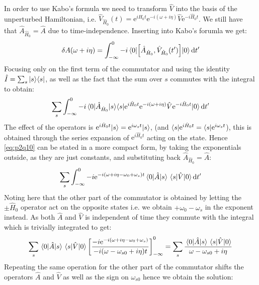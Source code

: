 \begin{solution}
In order to use Kabo's formula we need to transform $\hat{V}$ into the basis of the unperturbed Hamiltonian, i.e. $\hat{V}_{\hat{H}_0}(t) = \mathrm{e}^{i\hat{H}_0t}\mathrm{e}^{-i(\omega + i\eta)}\hat{V}\mathrm{e}^{-i\hat{H}_0t}$. We still have that $\hat{A}_{\hat{H}_0} = \hat{A}$ due to time-independence.
Inserting into Kabo's forumla we get:
\begin{equation}
    \delta A(\omega + i\eta) = \int_{-\infty}^{0}-i \mel{0}{\comm{\hat{A}_{\hat{H}_0}}{\hat{V}_{\hat{H}_0}(t')}}{0}\mathrm{d}t'
\end{equation}
Focusing only on the first term of the commutator and using the identity $\hat{I} = \sum_{s} |s\rangle\langle s |$, as well as the fact that the sum over $s$ commutes with the integral to obtain:
\begin{equation}\label{eq:p2q10}
    \sum_{s}\int_{-\infty}^{0}-i \mel{0}{\hat{A}_{\hat{H}_0} |s\rangle\langle s |\mathrm{e}^{i\hat{H}_0t}\mathrm{e}^{-i(\omega + i\eta)}\hat{V}\mathrm{e}^{-i\hat{H}_0t}}{0}\mathrm{d}t'
\end{equation}
The effect of the operators is $\mathrm{e}^{i\hat{H}_0t}|s\rangle = \mathrm{e}^{i\omega_st}|s\rangle$, (and $\langle s |\mathrm{e}^{i\hat{H}_0t} = \langle s |\mathrm{e}^{i\omega_st}$), this is obtained through the series expansion of $\mathrm{e}^{i\hat{H}_0t}$ acting on the state. Hence \eqref{eq:p2q10} can be stated in a more compact form, by taking the exponentials outside, as they are just constants, and substituting back $\hat{A}_{\hat{H}_0} = \hat{A}$:
\begin{equation}
    \sum_{s}\int_{-\infty}^{0}-i\mathrm{e}^{-i(\omega + i\eta -\omega_0 + \omega_s)t} \mel{0}{\hat{A}} {s}\mel{s}{\hat{V}}{0}\mathrm{d}t'
\end{equation}
Noting here that the other part of the commutator is obtained by letting the $\pm \hat{H}_0$ operator act on the opposite states i.e. we obtain $+\omega_0 - \omega_s$ in the exponent instead. As both $\hat{A}$ and $\hat{V}$ is independent of time they commute with the integral which is trivially integrated to get:
\begin{equation}
    \sum_{s}\mel{0}{\hat{A}} {s}\mel{s}{\hat{V}}{0}\left[\dfrac{-i\mathrm{e}^{-i(\omega + i\eta -\omega_0 + \omega_s)}}{-i(\omega -\omega_{s0} + i\eta)t}\right]_{-\infty}^{0} = \sum_{s}\dfrac{\mel{0}{\hat{A}} {s}\mel{s}{\hat{V}}{0}}{\omega -\omega_{s0} + i\eta}
\end{equation}
Repeating the same operation for the other part of the commutator shifts the operators $\hat{A}$ and $\hat{V}$ as well as the sign on $\omega_{s0}$ hence we obtain the solution:

\end{solution}
